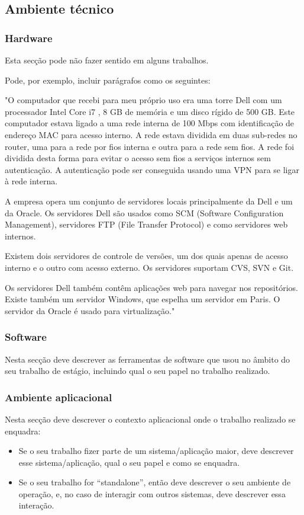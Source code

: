 \documentclass{article}
\begin{document}
\subsection{Ambiente técnico}
\subsubsection{Hardware}
Esta secção pode não fazer sentido em alguns trabalhos.

Pode, por exemplo, incluir parágrafos como os seguintes:

"O computador que recebi para meu próprio uso era uma torre Dell com um processador Intel Core i7 , 8 GB de memória e um disco rígido de 500 GB. Este computador estava ligado a uma rede interna de 100 Mbps com identificação de endereço MAC para acesso interno. A rede estava dividida em duas sub-redes no router, uma para a rede por fios interna e outra para a rede sem fios. A rede foi dividida desta forma para evitar o acesso sem fios a serviços internos sem autenticação. A autenticação pode ser conseguida usando uma VPN para se ligar à rede interna.

A empresa opera um conjunto de servidores locais principalmente da Dell e um da Oracle. Os servidores Dell são usados como SCM (Software Configuration Management),  servidores FTP (File Transfer Protocol) e como servidores web internos. 

Existem dois servidores de controle de versões, um dos quais apenas de acesso interno e o outro com acesso externo. Os servidores suportam CVS, SVN e Git.

Os servidores Dell também contêm aplicações web para navegar nos repositórios. Existe também um servidor Windows, que espelha um servidor em Paris. O servidor da Oracle é usado para virtualização."


\subsubsection{Software}
Nesta secção deve descrever as ferramentas de software que usou no âmbito do seu trabalho de estágio, incluindo qual o seu papel no trabalho realizado.

\subsubsection{Ambiente aplicacional}
Nesta secção deve descrever o contexto aplicacional onde o trabalho realizado se enquadra:

\begin{itemize}
\item Se o seu trabalho fizer parte de um sistema/aplicação maior, deve descrever esse sistema/aplicação, qual o seu papel e como se enquadra. 
\item Se o seu trabalho for “standalone”, então deve descrever o seu ambiente de operação, e, no caso de interagir com outros sistemas, deve descrever essa interação.
\end{itemize}
\end{document}
